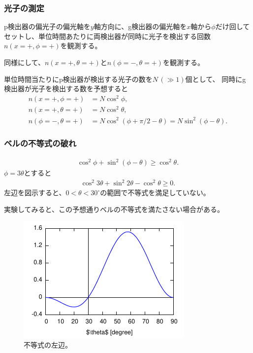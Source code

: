 \documentclass[10pt,b5paper,papersize,dvipdfmx]{jsbook}
\begin{document}
%
\subsubsection{光子の測定} %

p検出器の偏光子の偏光軸を$y$軸方向に、g検出器の偏光軸を$x$軸から$\phi$だけ回してセットし、単位時間あたりに両検出器が同時に光子を検出する回数$n(x=+,\phi=+)$を観測する。\par
同様にして、$n(x=+,\theta=+)$と$n(\phi=-,\theta=+)$を観測する。

単位時間当たりにp検出器が検出する光子の数を$N \,(\gg 1)$個として、
同時にg検出器が光子を検出する数を予想すると
\begin{align*}
  n(x=+,\phi=+) &= N \cos^2\phi, \\
  n(x=+,\theta=+) &= N \cos^2\theta, \\
  n(\phi=-,\theta=+) &= N \cos^2(\phi + \pi/2 - \theta) = N \sin^2(\phi - \theta).
\end{align*}

%
\subsubsection{ベルの不等式の破れ} %

\begin{align*}
  \cos^2\phi + \sin^2(\phi - \theta) \ge \cos^2\theta.
\end{align*}
$\phi = 3\theta$とすると
\begin{align*}
  \cos^2 3\theta + \sin^2 2\theta - \cos^2\theta \ge 0.
\end{align*}
左辺を図示すると、$0 < \theta < 30^\circ$の範囲で不等式を満足していない。

実験してみると、この予想通りベルの不等式を満たさない場合がある。

\begin{figure}[htp]
  \centering
  \includegraphics{nkym/fig/Aspect.pdf}
  \caption{不等式の左辺。}
\end{figure}
\end{document}
